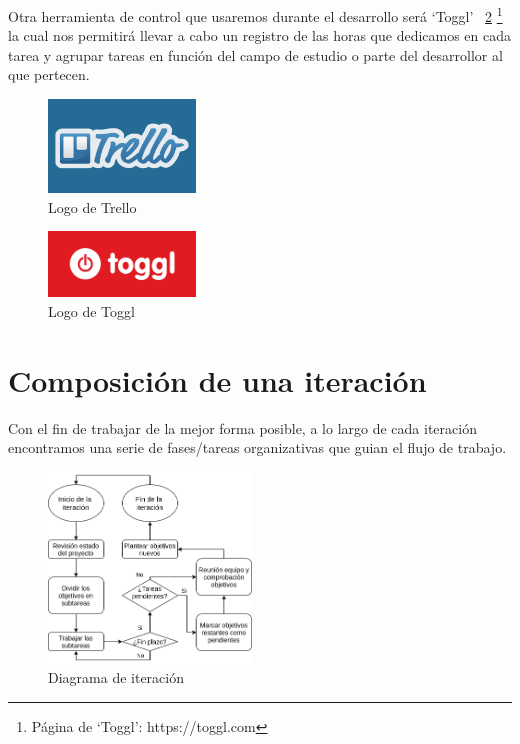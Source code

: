 Otra herramienta de control que usaremos durante el desarrollo será `Toggl'
~\ref{img:toggl} \footnote{Página de `Toggl': https://toggl.com}
la cual nos permitirá llevar a cabo un registro de las horas que dedicamos en cada tarea
y agrupar tareas en función del campo de estudio o parte del desarrollor al que pertecen.

\begin{figure}[ht]
\centering
\includegraphics[width=0.35\textwidth]{imagenes/metodologia/logo-trello.png}
\caption{Logo de Trello}
\label{img:trello}
\end{figure}

\begin{figure}[htb]
\centering
\includegraphics[width=0.35\textwidth]{imagenes/metodologia/logo-toggl.png}
\caption{Logo de Toggl}
\label{img:toggl}
\end{figure}

\section{Composición de una iteración}
Con el fin de trabajar de la mejor forma posible, a lo largo de cada iteración encontramos una 
serie de fases/tareas organizativas que guian el flujo de trabajo.    

\begin{figure}[hbt]
\centering
\includegraphics[width=0.48\textwidth]{imagenes/metodologia/Flow-iteracion.png}
\caption{Diagrama de iteración}
\label{img:fases_it}
\end{figure}

